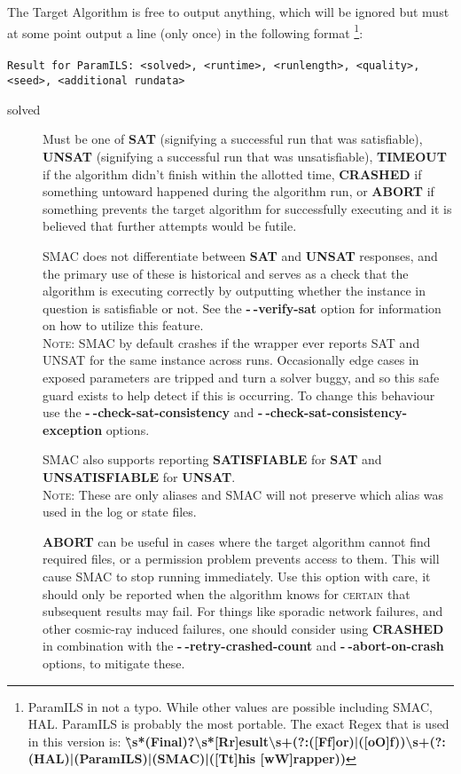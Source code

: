 \documentclass[manual.tex]{subfiles}
\begin{document}
The Target Algorithm is free to output anything, which will be ignored
but must at some point output a line (only once) in the following
format%
\footnote{ParamILS in not a typo. While other values are possible including
SMAC, HAL. ParamILS is probably the most portable. The exact Regex
that is used in this version is: \textbf{\^\textbackslash{}s{*}(Final)?\textbackslash{}s{*}{[}Rr{]}esult\textbackslash{}s+(?:([Ff]or)|([oO]f))\textbackslash{}s+(?:(HAL)|(ParamILS)|(SMAC)|([Tt]his
[wW]rapper))}}:%
\\
\\
\texttt{Result for ParamILS: <solved>, <runtime>, <runlength>, <quality>, <seed>, <additional rundata>} 
\begin{description}

\item [{solved}] Must be one of \textbf{SAT} (signifying a successful run that was satisfiable), \textbf{UNSAT} (signifying a successful run that was unsatisfiable), \textbf{TIMEOUT} if the algorithm didn't finish within the allotted time, \textbf{CRASHED} if something untoward happened during the algorithm run, or \textbf{ABORT} if something prevents the target algorithm for successfully executing and it is believed that further attempts would be futile. 

SMAC does not differentiate between \textbf{SAT} and \textbf{UNSAT} responses, and the primary use of these is historical and serves as a check that the algorithm is executing correctly by outputting whether the instance in question is satisfiable or not. See the \textbf{-$\!~$-verify-sat} option for information on how to utilize this feature. 
\\
\textsc{Note:} SMAC by default crashes if the wrapper ever reports SAT and UNSAT for the same instance across runs. Occasionally edge cases in exposed parameters are tripped and turn a solver buggy, and so this safe guard exists to help detect if this is occurring. To change this behaviour use the \textbf{-$\!~$-check-sat-consistency} and \textbf{-$\!~$-check-sat-consistency-exception} options.

SMAC also supports reporting \textbf{SATISFIABLE} for \textbf{SAT} and \textbf{UNSATISFIABLE} for \textbf{UNSAT}.
\\ \textsc{Note:} These are only aliases and SMAC will not preserve which alias was used in the log or state files.

\textbf{ABORT} can be useful in
cases where the target algorithm cannot find required files, or a
permission problem prevents access to them. This will cause SMAC to
stop running immediately. Use this option with care, it should only be reported when the algorithm knows for \textsc{certain} that subsequent results may fail. For things like sporadic network failures, and other cosmic-ray induced failures, one should consider using \textbf{CRASHED} in combination with the \textbf{-$\!~$-retry-crashed-count}  and \textbf{-$~\!\!$-abort-on-crash} options, to mitigate these.


\end{description}
\end{document}
